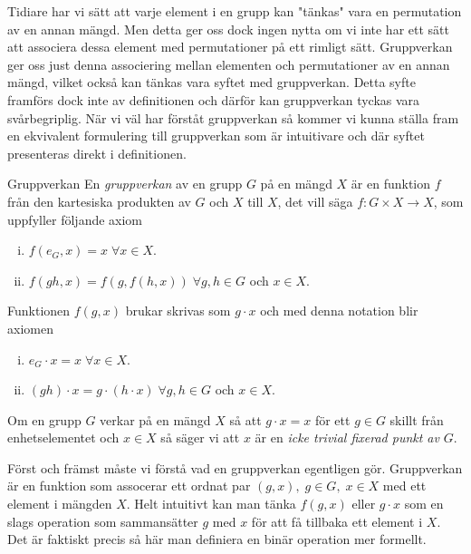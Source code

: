 \documentclass{article}
\theoremstyle{definition}
\begin{document}
Tidiare har vi sätt att varje element i en grupp kan "tänkas" vara en permutation 
av en annan mängd. Men detta ger oss dock ingen nytta om vi inte har ett sätt 
att associera dessa element med permutationer på ett rimligt sätt.
Gruppverkan ger oss just denna associering mellan elementen och permutationer 
av en annan mängd, vilket också kan tänkas vara syftet med gruppverkan. 
Detta syfte framförs dock inte av definitionen och därför kan gruppverkan
tyckas vara svårbegriplig. 
När vi väl har förståt gruppverkan så kommer vi kunna ställa fram en ekvivalent formulering
till gruppverkan som är intuitivare och där syftet presenteras direkt i definitionen.


\begin{mydef}{Gruppverkan}{}
  En \textit{gruppverkan} av en grupp $G$ på en mängd $X$ är en funktion $f$ från den 
  kartesiska produkten av $G$ och $X$ till $X$, det vill säga $f: G \times X \rightarrow X$,
  som uppfyller följande axiom
  \begin{enumerate}[(i)]
    \item $f(e_G, x) = x \; \forall x \in X$.
    \item $f(gh, x) = f(g, f(h,x)) \; \forall g, h \in G$ och $x \in X$.
  \end{enumerate}
  Funktionen $f(g, x)$ brukar skrivas som $g \cdot x$ och med denna notation 
  blir axiomen
  \begin{enumerate}[(i)]
    \item $e_G \cdot x = x \; \forall x \in X$.
    \item $(gh) \cdot x = g \cdot (h \cdot x) \; \forall g, h \in G$ och $x \in X$.
  \end{enumerate}
  Om en grupp $G$ verkar på en mängd $X$ så att $g \cdot x = x$ för ett $g \in G$ skillt från enhetselementet och $x \in X$ så säger vi att $x$ är en 
  \textit{icke trivial fixerad punkt av} $G$.
\end{mydef}
Först och främst måste vi förstå vad en gruppverkan egentligen gör. 
Gruppverkan är en funktion som assocerar ett ordnat par $(g, x), \; g \in G, \; x \in X$
med ett element i mängden $X$. Helt intuitivt kan man tänka $f(g, x)$ eller 
$g \cdot x$ som en slags operation som sammansätter $g$ med $x$ för att få tillbaka ett 
element i $X$. Det är faktiskt precis så här man definiera en binär operation mer formellt. 
\end{document}
